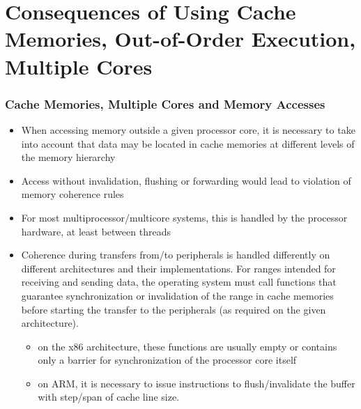 \documentclass{beamer}
\begin{document}
\section{Consequences of Using Cache Memories, Out-of-Order Execution, Multiple Cores}

\begin{frame}
\frametitle{Cache Memories, Multiple Cores and Memory Accesses}

\begin{itemize}
\item When accessing memory outside a given processor core, it is necessary to take into account that data may be located in cache memories at different levels of the memory hierarchy
\item Access without invalidation, flushing or forwarding would lead to violation of memory coherence rules
\item For most multiprocessor/multicore systems, this is handled by the processor hardware, at least between threads
\item Coherence during transfers from/to peripherals is handled differently on different architectures and their implementations. For ranges intended for receiving and sending data, the operating system must
call functions that guarantee synchronization or invalidation of the range in cache memories
before starting the transfer to the peripherals (as required on the given architecture).

\begin{itemize}
\item  on the x86 architecture, these functions are usually empty or contains only a barrier for synchronization of the processor core itself
\item on ARM, it is necessary to issue instructions to flush/invalidate the buffer with step/span of cache line size.
\end{itemize}
\end{itemize}
\end{frame}
\end{document}
